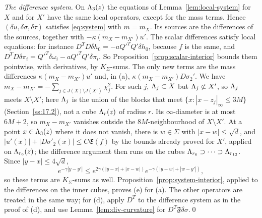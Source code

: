 \emph{The difference system.} On $\Lambda_3(z)$ the equations of Lemma~\ref{lem:local-system} for $X$ and for $X'$ have the same local operators, except for the mass terms. Hence $(\delta u,\delta\sigma,\delta\tau)$ satisfies \eqref{eq:system} with $m=m_X$. Its sources are the differences of the sources, together with $-\kappa(m_X-m_{X'})u'$. The scalar differences satisfy local equations: for instance $D^TD\delta h_0=-aQ'^TQ'\delta h_0$, because $f$ is the same, and $D^TD\delta\pi_i=Q'^T\delta\omega_i-aQ'^TQ'\delta\pi_i$. So Proposition~\ref{prop:scalar-interior} bounds them pointwise, with derivatives, by $K_\Sigma$-sums. The only new terms are the mass differences $\kappa(m_X-m_{X'})u'$ and, in (a), $\kappa(m_X-m_{X'})D\sigma_2'$. We have $m_X-m_{X'}=-\sum_{j\in J(X)\setminus J(X')}\chi_j^2$. For such $j$, $\Lambda_j\subset X$ but $\Lambda_j\not\subset X'$, so $\Lambda_j$ meets $X\setminus X'$; here $\Lambda_j$ is the union of the blocks that meet $\{x:|x-z_j|_\infty\le3M\}$ (Section~\ref{ss:17.2}), not a cube $\Lambda_r(z)$ of radius $r$. Its $\infty$-diameter is at most $6M+2$, so $m_X-m_{X'}$ vanishes outside the $8M$-neighbourhood of $X\setminus X'$. At a point $x\in\Lambda_3(z)$ where it does not vanish, there is $w\in\Sigma$ with $|x-w|\le\sqrt d$, and $|u'(x)|+|D\sigma'_2(x)|\le C\mathfrak E(f)$ by the bounds already proved for $X'$, applied on $\Lambda_{r_6}(z)$; the difference argument then runs on the cubes $\Lambda_{r_6}\supset\dots\supset\Lambda_{r_{12}}$. Since $|y-x|\le4\sqrt d$,
\[
e^{-\gamma|y-y'|}\le e^{2\gamma(|y-x|+|x-w|)}e^{-\gamma(|y-w|+|w-y'|)},
\]
so these terms are $K_\Sigma$-sums as well. Proposition~\ref{prop:system-interior}, applied to the differences on the inner cubes, proves (e) for (a). The other operators are treated in the same way; for (d), apply $D^T$ to the difference system as in the proof of (d), and use Lemma~\ref{lem:div-curvature} for $D^T\mathfrak F\delta\sigma$.\qed
